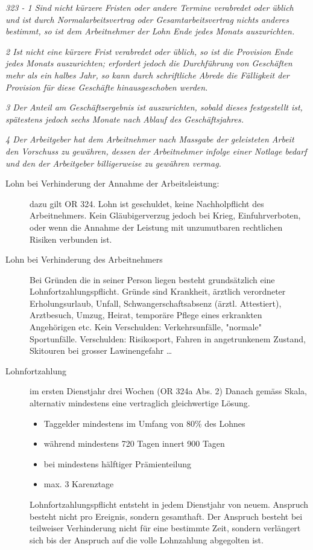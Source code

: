 \textit{323 - 1 Sind nicht kürzere Fristen oder andere Termine verabredet oder üblich und ist durch Normalarbeitsvertrag oder Gesamtarbeitsvertrag nichts anderes bestimmt, so ist dem Arbeitnehmer der Lohn Ende jedes Monats auszurichten.}

\textit{2 Ist nicht eine kürzere Frist verabredet oder üblich, so ist die Provision Ende jedes Monats auszurichten; erfordert jedoch die Durchführung von Geschäften mehr als ein halbes Jahr, so kann durch schriftliche Abrede die Fälligkeit der Provision für diese Geschäfte hinausgeschoben werden.}

\textit{3 Der Anteil am Geschäftsergebnis ist auszurichten, sobald dieses festgestellt ist, spätestens jedoch sechs Monate nach Ablauf des Geschäftsjahres.}

\textit{4 Der Arbeitgeber hat dem Arbeitnehmer nach Massgabe der geleisteten Arbeit den Vorschuss zu gewähren, dessen der Arbeitnehmer infolge einer Notlage bedarf und den der Arbeitgeber billigerweise zu gewähren vermag.}

\begin{description}
  \item[Lohn bei Verhinderung der Annahme der Arbeitsleistung:] dazu gilt OR 324. Lohn ist geschuldet, keine Nachholpflicht des Arbeitnehmers. Kein Gläubigerverzug jedoch bei Krieg, Einfuhrverboten, oder wenn die Annahme der Leistung mit unzumutbaren rechtlichen Risiken verbunden ist. 
  \item[Lohn bei Verhinderung des Arbeitnehmers] Bei Gründen die in seiner Person liegen besteht grundsätzlich eine Lohnfortzahlungspflicht. Gründe sind Krankheit, ärztlich verordneter Erholungsurlaub, Unfall, Schwangerschaftsabsenz (ärztl. Attestiert), Arztbesuch, Umzug, Heirat, temporäre Pflege eines erkrankten Angehörigen etc.
  Kein Verschulden: Verkehrsunfälle, "normale" Sportunfälle. Verschulden: Risikosport, Fahren in angetrunkenem Zustand, Skitouren bei grosser Lawinengefahr \ldots 
  
  \item[Lohnfortzahlung] im ersten Dienstjahr drei Wochen (OR 324a Abs. 2)
  Danach gemäss Skala, alternativ mindestens eine vertraglich gleichwertige Lösung.
  \begin{itemize}
    \item Taggelder mindestens im Umfang von 80\% des Lohnes
    \item während mindestens 720 Tagen innert 900 Tagen
    \item bei mindestens hälftiger Prämienteilung
    \item max. 3 Karenztage
  \end{itemize}
  
  \noindent
  Lohnfortzahlungspflicht entsteht in jedem Dienstjahr von neuem. Anspruch besteht nicht pro Ereignis, sondern gesamthaft. Der Anspruch besteht bei teilweiser Verhinderung nicht für eine bestimmte Zeit, sondern verlängert sich bis der Anspruch auf die volle Lohnzahlung abgegolten ist.
\end{description}
  
